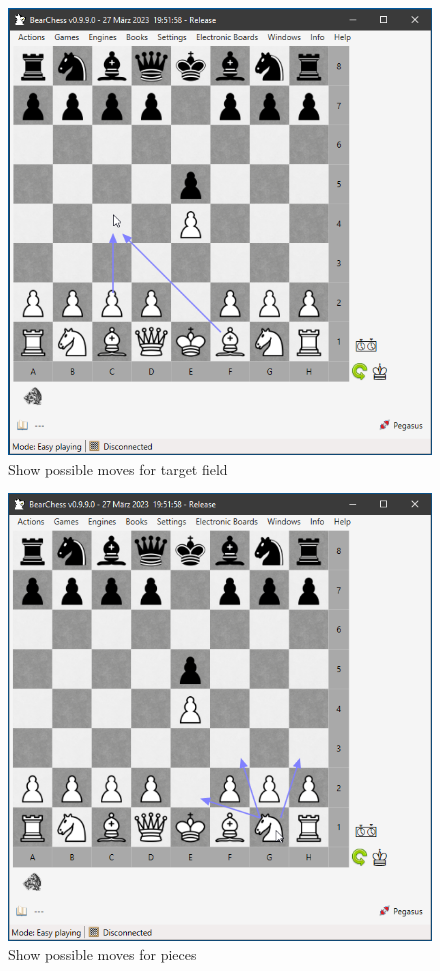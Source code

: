 \documentclass[11pt,a4paper]{article}
\begin{document}
\begin{figure}[H]
	\centering
	\includegraphics[scale=0.8]{SettingsBoardAndPieces5.png}
	\caption{Show possible moves for target field}
	\label{fig:ShowPossibleMoves}
\end{figure}


\begin{figure}[H]
	\centering
	\includegraphics[scale=0.8]{SettingsBoardAndPieces6.png}
	\caption{Show possible moves for pieces}
	\label{fig:ShowPossibleMoves2}
\end{figure}
\end{document}
